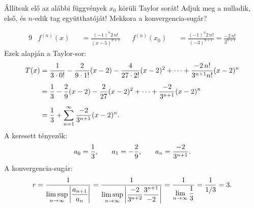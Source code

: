 \begin{exercise}{%
    Állítsuk elő az alábbi függvények $x_0$ körüli Taylor sorát!
    Adjuk meg a nulladik, első, és $n$-edik tag együtthatóját! Mekkora a
    konvergencia-sugár?
  }
{\begin{enumerate}[a)]
\begin{alignat*}{9}
               & f^{(n)}(x) &  & = \frac{(-1)^n 2 \, n!}{(x-5)^{n+1}} &  & f^{(n)}(x_0) &  & = \frac{(-1)^n 2 \, n!}{(-3)^{n+1}} = \frac{-2 \, n!}{3^{n+1}}
            \end{alignat*}
            Ezek alapján a Taylor-sor:
            \begin{align*}
              T(x)
               & = \frac{1}{3 \cdot 0!}
              - \frac{2}{9 \cdot 1!} (x - 2)
              - \frac{4}{27\cdot 2!} (x - 2)^2
              + \dots
              + \frac{-2 \, n!}{3^{n+1} n!} (x - 2)^n
              \\[2mm]
               & = \frac{1}{3}
              - \frac{2}{9} (x - 2)
              - \frac{2}{27} (x - 2)^2
              + \dots
              + \frac{-2}{3^{n+1}} (x - 2)^n
              \\[2mm]
               & = \frac{1}{3}
              + \sum_{n = 1}^\infty \frac{-2}{3^{n+1}} (x - 2)^n
              \text.
            \end{align*}
            A keresett tényezők:
            \[
              a_0 = \frac{1}{3}
              \text, \qquad
              a_1 = -\frac{2}{9}
              \text, \qquad
              a_n = \frac{-2}{3^{n+1}}
              \text.
            \]
            A konvergencia-sugár:
            \[
              r
              = \frac{1}{\displaystyle\limsup_{n \rightarrow \infty} \left|
                \dfrac{a_{n+1}}{a_n}
                \right|
              }
              = \frac{1}{\displaystyle\limsup_{n \rightarrow \infty} \left|
                \dfrac{-2}{3^{n+2}} \dfrac{3^{n+1}}{-2}
                \right|
              }
              = \frac{1}{\displaystyle\lim_{n \rightarrow \infty}\dfrac{1}{3}}
              = \frac{1}{1/3}
              = 3
              \text.
            \]


\end{enumerate}}
\end{exercise}
